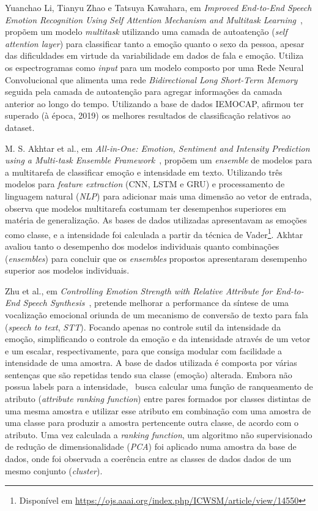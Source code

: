 Yuanchao Li, Tianyu Zhao e Tatsuya Kawahara, em \textit{Improved End-to-End Speech Emotion Recognition Using Self Attention Mechanism and Multitask Learning}~\cite{32.95}, propõem um modelo \textit{multitask} utilizando uma camada de autoatenção (\textit{self attention layer}) para classificar tanto a emoção quanto o sexo da pessoa, apesar das dificuldades em virtude da variabilidade em dados de fala e emoção. Utiliza os espectrogramas como \textit{input} para um modelo composto por uma Rede Neural Convolucional que alimenta uma rede \textit{Bidirectional Long Short-Term Memory} seguida pela camada de autoatenção para agregar informações da camada anterior ao longo do tempo. Utilizando a base de dados IEMOCAP, afirmou ter superado (à época, 2019) os melhores resultados de classificação relativos ao dataset.

M. S. Akhtar et al., em \textit{All-in-One: Emotion, Sentiment and Intensity Prediction using a Multi-task Ensemble Framework}~\cite{28}, propõem um \textit{ensemble} de modelos para a multitarefa de classificar emoção e intensidade em texto. Utilizando três modelos para \textit{feature extraction} (\acrshort{CNN}, \acrlong{LSTM} e \acrshort{GRU}) e processamento de linguagem natural (\textit{NLP}) para adicionar mais uma dimensão ao vetor de entrada, observa que modelos multitarefa costumam ter desempenhos superiores em matéria de generalização. As bases de dados utilizadas apresentavam as emoções como classe, e a intensidade foi calculada a partir da técnica de Vader\footnote{Disponível em \url{https://ojs.aaai.org/index.php/ICWSM/article/view/14550}}. Akhtar avaliou tanto o desempenho dos modelos individuais quanto combinações (\textit{ensembles}) para concluir que os \textit{ensembles} propostos apresentaram desempenho superior aos modelos individuais.

Zhu et al., em \textit{Controlling Emotion Strength with Relative Attribute for End-to-End Speech Synthesis}~\cite{63}, pretende melhorar a performance da síntese de uma vocalização emocional oriunda de um mecanismo de conversão de texto para fala (\textit{speech to text}, \textit{STT}). Focando apenas no controle sutil da intensidade da emoção, simplificando o controle da emoção e da intensidade através de um vetor e um escalar, respectivamente, para que consiga modular com facilidade a intensidade de uma amostra. A base de dados utilizada é composta por várias sentenças que são repetidas tendo sua classe (emoção) alterada. Embora não possua labels para a intensidade,~\cite{63} busca calcular uma função de ranqueamento de atributo (\textit{attribute ranking function}) entre pares formados por classes distintas de uma mesma amostra e utilizar esse atributo em combinação com uma amostra de uma classe para produzir a amostra pertencente outra classe, de acordo com o atributo. Uma vez calculada a \textit{ranking function}, um algoritmo não supervisionado de redução de dimensionalidade (\textit{PCA}) foi aplicado numa amostra da base de dados, onde foi observada a coerência entre as classes de dados dados de um mesmo conjunto (\textit{cluster}).

